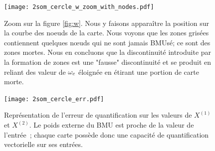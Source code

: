 \documentclass[../main]{subfiles}
\begin{document}
\begin{figure}
	\texttt{[image: 2som\_cercle\_w\_zoom\_with\_nodes.pdf]}
	\caption{Zoom sur la figure \ref{fig:w}. Nous y faisons apparaître la position sur la courbe des noeuds de la carte. Nous voyons que les zones grisées contiennent quelques n\oe{}uds qui ne sont jamais BMUsé; ce sont des zones mortes. Nous en concluons que la discontinuité introduite par la formation de zones est une "fausse" discontinuité et se produit en reliant des valeur de $\omega_c$ éloignée en étirant une portion de carte morte. \label{fig:w_zoom}}
\end{figure}

\begin{figure}
	\texttt{[image: 2som\_cercle\_err.pdf]}
	\caption{Représentation de l'erreur de quantification sur les valeurs de $X^{(1)}$ et $X^{(2)}$. Le poids externe du BMU est proche de la valeur de l'entrée~; chaque carte possède donc une capacité de quantification vectorielle sur ses entrées. \label{fig:qv}}
\end{figure}




\end{document}
